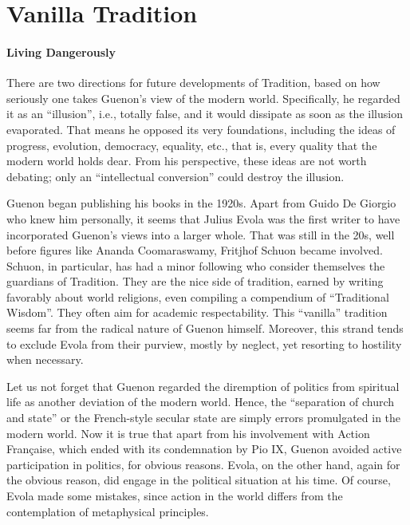 \section{Vanilla Tradition}

\paragraph{Living Dangerously}


There are two directions for future developments of Tradition, based on how seriously one takes Guenon's view of the modern world. Specifically, he regarded it as an ``illusion'', i.e., totally false, and it would dissipate as soon as the illusion evaporated. That means he opposed its very foundations, including the ideas of progress, evolution, democracy, equality, etc., that is, every quality that the modern world holds dear. From his perspective, these ideas are not worth debating; only an ``intellectual conversion'' could destroy the illusion.

Guenon began publishing his books in the 1920s. Apart from Guido De Giorgio who knew him personally, it seems that Julius Evola was the first writer to have incorporated Guenon's views into a larger whole. That was still in the 20s, well before figures like Ananda Coomaraswamy, Fritjhof Schuon became involved. Schuon, in particular, has had a minor following who consider themselves the guardians of Tradition. They are the nice side of tradition, earned by writing favorably about world religions, even compiling a compendium of ``Traditional Wisdom''. They often aim for academic respectability. This ``vanilla'' tradition seems far from the radical nature of Guenon himself. Moreover, this strand tends to exclude Evola from their purview, mostly by neglect, yet resorting to hostility when necessary.

Let us not forget that Guenon regarded the diremption of politics from spiritual life as another deviation of the modern world. Hence, the ``separation of church and state'' or the French-style secular state are simply errors promulgated in the modern world. Now it is true that apart from his involvement with Action Française, which ended with its condemnation by Pio IX, Guenon avoided active participation in politics, for obvious reasons. Evola, on the other hand, again for the obvious reason, did engage in the political situation at his time. Of course, Evola made some mistakes, since action in the world differs from the contemplation of metaphysical principles.

